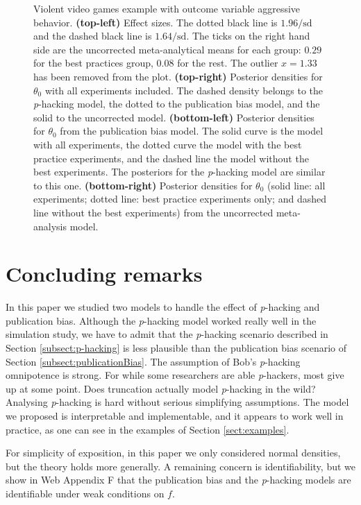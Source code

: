 \documentclass[useAMS,usenatbib,referee]{biom}
\begin{document}
\begin{figure}
\caption{\label{fig:anderson2010}Violent video games example with outcome variable aggressive behavior. \textbf{(top-left)} Effect sizes. The dotted black line is $1.96/\textrm{sd}$ and the dashed black line is $1.64/\textrm{sd}$. The ticks on the right hand side are the uncorrected meta-analytical means for each group: $0.29$ for the best practices group, $0.08$ for the rest. The outlier $x=1.33$ has been removed from the plot.
\textbf{(top-right)} Posterior densities for $\theta_{0}$ with all experiments included. The dashed density belongs to the \textit{p}-hacking model, the dotted to the publication bias model, and the solid to the uncorrected model. \textbf{(bottom-left)} Posterior densities for $\theta_{0}$ from the publication bias model. The solid curve is the model with all experiments, the dotted curve the model with the best practice experiments, and the dashed line the model without the best experiments. The posteriors for the \textit{p}-hacking model are similar to this one. \textbf{(bottom-right)} Posterior densities for $\theta_{0}$ (solid line: all experiments; dotted line: best practice experiments only; and dashed line without the best experiments) from the uncorrected meta-analysis model.}
\end{figure}

\section{Concluding remarks}\label{sect:conclusions}

In this paper we studied two models to handle the effect of \textit{p}-hacking and publication bias. Although the \textit{p}-hacking model worked really well in the simulation study, we have to admit that the \textit{p}-hacking scenario described in Section \ref{subsect:p-hacking} is less plausible than the publication bias scenario of Section \ref{subsect:publicationBias}. The assumption of Bob's \textit{p}-hacking omnipotence is strong. For while some researchers are able \textit{p}-hackers, most give up at some point. Does truncation actually model \textit{p}-hacking in the wild? Analysing \textit{p}-hacking is hard without serious simplifying assumptions. The model we proposed is interpretable and implementable, and it appears to work well in practice, as one can see in the examples of Section \ref{sect:examples}. 

For simplicity of exposition, in this paper we only considered normal densities, but the theory holds more generally. A remaining concern is identifiability, but we show in Web Appendix F that the publication bias and the \textit{p}-hacking models are identifiable under weak conditions on $f$.
\end{document}
